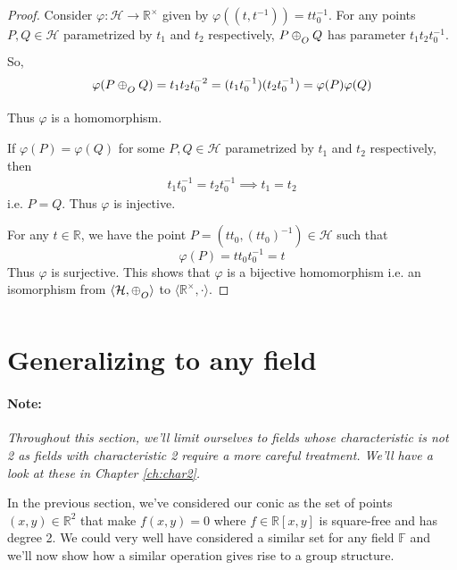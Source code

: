 \begin{proof}
    Consider $\varphi:\mathcal{H} \to \mathbb{R}^\times$ given by
    $\varphi((t,t^{-1})) = t t_0^{-1}$. For any points
    $P,Q\in\mathcal{H}$ parametrized by $t_1$ and $t_2$ respectively,
    $P \conop Q$ has parameter $t_1 t_2 t_0^{-1}$. So,
    \[
        \varphi(P \conop Q) = t_1 t_2 t_0^{-2} = (t_1 t_0^{-1}) (t_2 t_0^{-1})
        = \varphi(P) \varphi(Q)
    \]
    Thus $\varphi$ is a homomorphism.
    \vspace{1ex}

    \noindent
    If $\varphi(P)=\varphi(Q)$ for some $P,Q\in\mathcal{H}$ parametrized by $t_1$
    and $t_2$ respectively, then
    \begin{align*}
        t_1 t_0^{-1} = t_2 t_0^{-1} \implies t_1 = t_2
    \end{align*}
    i.e. $P=Q$. Thus $\varphi$ is injective.
    \vspace{1ex}

    \noindent
    For any $t \in \mathbb{R}$, we have the point
    $P=(t t_0,(t t_0)^{-1}) \in \mathcal{H}$ such that
    \[ \varphi(P) = t t_0 t_0^{-1} = t \]
    Thus $\varphi$ is surjective. This shows that $\varphi$ is a bijective
    homomorphism i.e. an isomorphism from $\langle \mathcal{H},\conop \rangle$ to
    $\langle \mathbb{R}^\times,\cdot \rangle$.
\end{proof}

\section{Generalizing to any field}

\paragraph{Note:} \emph{Throughout this section, we'll limit ourselves to fields
    whose characteristic is not 2 as fields with characteristic 2 require a more
    careful treatment. We'll have a look at these in Chapter \ref{ch:char2}.}
\vspace{1ex}

\noindent
In the previous section, we've considered our conic as the set of points
$(x,y)\in\mathbb{R}^2$ that make $f(x,y)=0$ where $f\in\mathbb{R}[x,y]$ is
square-free and has degree 2. We could very well have considered a similar set
for any field $\mathbb{F}$ and we'll
now show how a similar operation gives rise to a group structure.
\vspace{1ex}

